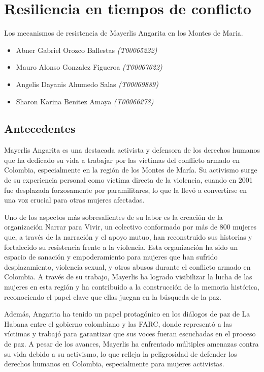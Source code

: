\documentclass[letterpaper, 12pt]{article}
\begin{document}
\section*{Resiliencia en tiempos de conflicto}

\vspace{-1cm}

\noindent Los mecanismos de resistencia de Mayerlis Angarita en los Montes de Maria.

\noindent\makebox[\linewidth]{\rule{\textwidth}{0.4pt}}

\begin{itemize}[label=$\triangleright$]
      \item Abner Gabriel Orozco Ballestas \textit{(T00065222)}
      \item Mauro Alonso Gonzalez Figueroa \textit{(T00067622)}
      \item Angelis Dayanis Ahumedo Salas \textit{(T00069889)}
      \item Sharon Karina Benitez Amaya \textit{(T00066278)}
\end{itemize}

\subsection*{Antecedentes}

Mayerlis Angarita es una destacada activista y defensora de los derechos
humanos que ha dedicado su vida a trabajar por las víctimas del conflicto
armado en Colombia, especialmente en la región de los Montes de María. Su
activismo surge de su experiencia personal como víctima directa de la
violencia, cuando en 2001 fue desplazada forzosamente por paramilitares, lo que
la llevó a convertirse en una voz crucial para otras mujeres afectadas.

Uno de los aspectos más sobresalientes de su labor es la creación de la
organización Narrar para Vivir, un colectivo conformado por más de 800 mujeres
que, a través de la narración y el apoyo mutuo, han reconstruido sus historias
y fortalecido su resistencia frente a la violencia. Esta organización ha sido
un espacio de sanación y empoderamiento para mujeres que han sufrido
desplazamiento, violencia sexual, y otros abusos durante el conflicto armado en
Colombia. A través de su trabajo, Mayerlis ha logrado visibilizar la lucha de
las mujeres en esta región y ha contribuido a la construcción de la memoria
histórica, reconociendo el papel clave que ellas juegan en la búsqueda de la
paz.

Además, Angarita ha tenido un papel protagónico en los diálogos de paz de La
Habana entre el gobierno colombiano y las FARC, donde representó a las víctimas
y trabajó para garantizar que sus voces fueran escuchadas en el proceso de paz.
A pesar de los avances, Mayerlis ha enfrentado múltiples amenazas contra su
vida debido a su activismo, lo que refleja la peligrosidad de defender los
derechos humanos en Colombia, especialmente para mujeres activistas.
\end{document}
